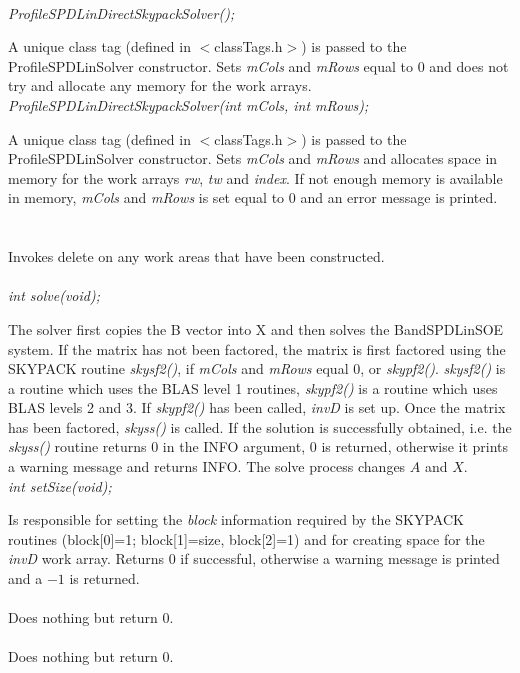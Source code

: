   \\
{\em ProfileSPDLinDirectSkypackSolver();}  

A unique class tag (defined in $<$classTags.h$>$) is passed to the
ProfileSPDLinSolver constructor. Sets {\em mCols} and {\em mRows}
equal to $0$ and does not try and allocate any memory for the work arrays.\\

{\em ProfileSPDLinDirectSkypackSolver(int mCols, int mRows);}  

A unique class tag (defined in $<$classTags.h$>$) is passed to the
ProfileSPDLinSolver constructor. Sets {\em mCols} and {\em mRows} and
allocates space in memory for the work arrays {\em rw}, {\em tw} and
{\em index}. If not enough memory is available in memory, {\em mCols}
and {\em mRows} is set equal to $0$ and an error message is printed. \\

 \\
\\ 
Invokes delete on any work areas that have been constructed. \\

  \\
{\em  int solve(void);} 

The solver first copies the B vector into X and then solves the
BandSPDLinSOE system. If the matrix has not been factored, the matrix
is first factored using the SKYPACK routine {\em skysf2()}, if {\em
mCols} and {\em mRows} equal $0$, or {\em skypf2()}. {\em skysf2()} is
a routine which uses the BLAS level 1 routines, {\em skypf2()} is a
routine which uses BLAS levels 2 and 3. If {\em skypf2()}
has been called, {\em invD} is set up. Once the matrix has been
factored, {\em skyss()} is called. If the solution is successfully
obtained, i.e. the {\em skyss()} routine returns $0$ in the INFO
argument, $0$ is returned, otherwise it prints a warning message and
returns INFO. The solve process changes $A$ and $X$. \\   

{\em  int setSize(void);} 

Is responsible for setting the {\em block} information required by the
SKYPACK routines (block[0]=1; block[1]=size, block[2]=1) and for
creating space for the {\em invD} work array. Returns $0$ if
successful, otherwise a warning message is printed and a $-1$ is
returned. \\

 \\ 
Does nothing but return $0$. \\

 \\ 
Does nothing but return $0$. \\







